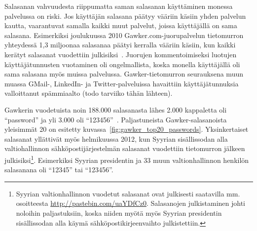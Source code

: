 \documentclass[finnish,gradu]{tktltiki}
\begin{document}
  Salasanan vahvuudesta riippumatta saman salasanan käyttäminen monessa palvelussa on riski. Jos käyttäjän salasana päätyy vääriin käsiin yhden palvelun kautta, vaarantuvat samalla kaikki muut palvelut, joissa käyttäjällä on sama salasana. Esimerkiksi joulukuussa 2010 Gawker.com-juorupalvelun tietomurron yhteydessä 1,3 miljoonaa salasanaa päätyi kerralla vääriin käsiin, kun kaikki kerätyt salasanat vuodettiin julkisiksi~\cite{bbc_gawker_12_2010, forbes_gawker_12_2010}. Juorujen kommentoimiseksi luotujen käyttäjätunnusten vuotaminen oli ongelmallista, koska monella käyttäjällä oli sama salasana myös muissa palvelussa. Gawker-tietomurron seurauksena muun muassa GMail-, LinkedIn- ja Twitter-palveluissa havaittiin käyttäjätunnuksia valloittanut spämmiaalto (todo tarviiko tähän lähteen).

   Gawkerin vuodetuista noin 188.000 salasanasta lähes 2.000 kappaletta oli ``password'' ja yli 3.000 oli  ``123456''~\cite{forbes_gawker_12_2010}. Paljastuneista Gawker-salasanoista yleisimmät 20 on esitetty kuvassa~\ref{fig:gawker_top20_passwords}. Yksinkertaiset salasanat yllättivät myös helmikuussa 2012, kun Syyrian sisällissodan alla valtiohallinnon sähköpostijärjestelmän salasanat vuodettiin tietomurron jälkeen julkisiksi\footnote{Syyrian valtionhallinnon vuodetut salasanat ovat julkisesti saatavilla mm. osoitteesta \url{http://pastebin.com/uaYDfCz0}. Salasanojen julkistaminen johti noloihin paljastuksiin, koska niiden myötä myös Syyrian presidentin sisällissodan alla käymä sähköpostikirjeenvaihto julkistettiin.}. Esimerkiksi Syyrian presidentin ja 33 muun valtionhallinnon henkilön salasanana oli ``12345'' tai ``123456''.
\end{document}
